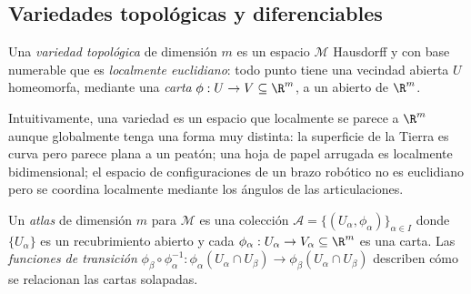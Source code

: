\subsection{Variedades topol\'ogicas y diferenciables}
\label{sec:found:diff-manifolds}

\begin{definition}
\label{def:found:topmanifold}
Una \emph{variedad topol\'ogica} de dimensi\'on $m$ es un espacio $\mathcal{M}$
Hausdorff y con base numerable que es \emph{localmente euclidiano}: todo punto tiene
una vecindad abierta $U$ homeomorfa, mediante una \emph{carta} $\phi : U \to V
\subseteq \R^m$, a un abierto de $\R^m$.
\end{definition}

Intuitivamente, una variedad es un espacio que localmente se parece a $\R^m$
aunque globalmente tenga una forma muy distinta: la superficie de la Tierra es
curva pero parece plana a un peat\'on; una hoja de papel arrugada es localmente
bidimensional; el espacio de configuraciones de un brazo rob\'otico no es euclidiano
pero se coordina localmente mediante los \'angulos de las articulaciones.

\begin{definition}
\label{def:found:atlas}
Un \emph{atlas} de dimensi\'on $m$ para $\mathcal{M}$ es una colecci\'on
$\mathcal{A} = \{(U_\alpha, \phi_\alpha)\}_{\alpha \in I}$ donde $\{U_\alpha\}$ es
un recubrimiento abierto y cada $\phi_\alpha : U_\alpha \to V_\alpha \subseteq \R^m$
es una carta. Las \emph{funciones de transici\'on} $\phi_\beta \circ
\phi_\alpha^{-1} : \phi_\alpha(U_\alpha \cap U_\beta) \to \phi_\beta(U_\alpha \cap
U_\beta)$ describen c\'omo se relacionan las cartas solapadas.
\end{definition}

